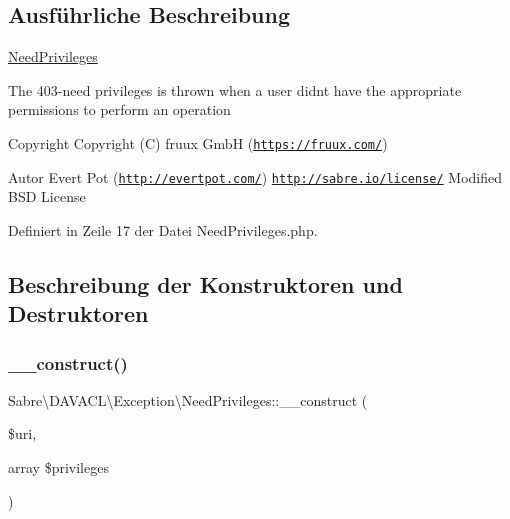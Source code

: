 \subsection{Ausführliche Beschreibung}
\mbox{\hyperlink{class_sabre_1_1_d_a_v_a_c_l_1_1_exception_1_1_need_privileges}{Need\+Privileges}}

The 403-\/need privileges is thrown when a user didn\textquotesingle{}t have the appropriate permissions to perform an operation

\begin{DoxyCopyright}{Copyright}
Copyright (C) fruux GmbH (\href{https://fruux.com/}{\tt https\+://fruux.\+com/}) 
\end{DoxyCopyright}
\begin{DoxyAuthor}{Autor}
Evert Pot (\href{http://evertpot.com/}{\tt http\+://evertpot.\+com/})  \href{http://sabre.io/license/}{\tt http\+://sabre.\+io/license/} Modified B\+SD License 
\end{DoxyAuthor}


Definiert in Zeile 17 der Datei Need\+Privileges.\+php.



\subsection{Beschreibung der Konstruktoren und Destruktoren}
\mbox{\label{class_sabre_1_1_d_a_v_a_c_l_1_1_exception_1_1_need_privileges_ac98b0253f55ae12dd034c5e0103af38d}} 
\subsubsection{\texorpdfstring{\+\_\+\+\_\+construct()}{\_\_construct()}}
{\footnotesize\ttfamily Sabre\textbackslash{}\+D\+A\+V\+A\+C\+L\textbackslash{}\+Exception\textbackslash{}\+Need\+Privileges\+::\+\_\+\+\_\+construct (\begin{DoxyParamCaption}\item[{}]{\$uri,  }\item[{array}]{\$privileges }\end{DoxyParamCaption})}

